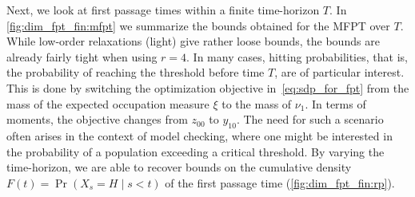 Next, we look at first passage times within a finite time-horizon $T$.
In \autoref{fig:dim_fpt_fin:mfpt} we summarize the bounds obtained for the MFPT over $T$.
While low-order relaxations (light) give rather loose bounds, the bounds are already fairly tight
when using $r=4$.
In many cases, hitting probabilities, that is, the probability of reaching the
threshold before time $T$, are of particular interest.
This is done by switching the optimization objective in~\eqref{eq:sdp_for_fpt} from the mass of the
expected occupation measure $\xi$ to the mass of $\nu_1$.
In terms of moments, the objective changes from $z_{00}$ to $y_{10}$.
The need for such a scenario often arises in the context of model checking, where one might be
interested in the probability of a population exceeding a critical threshold.
By varying the time-horizon, we are able to recover bounds on the cumulative density $F(t) = \Pr(X_s=H\mid s<t)$ of
the first passage time (\autoref{fig:dim_fpt_fin:rp}).
